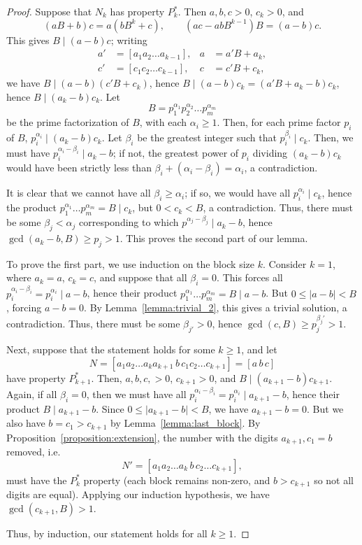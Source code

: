\documentclass[10pt,a4paper]{amsart}
\begin{document}
\begin{proof}
    Suppose that $N_k$ has property $P^*_k$. Then $a, b, c > 0$, $c_k > 0$, and \[
        (aB + b)c = a(bB^k + c), \qquad
        (ac - abB^{k - 1})B = (a - b)c.
    \] This gives $B \mid (a - b)c$; writing \begin{align*}
        a' &= [a_1a_2\dots a_{k - 1}], & a &= a'B + a_k, \\
        c' &= [c_1c_2\dots c_{k - 1}], & c &= c'B + c_k,
    \end{align*} 
    we have $B \mid (a - b)(c'B + c_k)$, hence $B\mid (a - b)c_k = (a'B + a_k - b)c_k$,
    hence $B \mid (a_k - b)c_k$. Let \[
        B = p_1^{\alpha_1}p_2^{\alpha_2}\dots p_m^{\alpha_m}
    \] be the prime factorization of $B$, with each $\alpha_i \geq 1$.
    Then, for each prime factor $p_i$ of $B$, $p_i^{\alpha_i}\mid (a_k - b)c_k$.
    Let $\beta_i$ be the greatest integer such that $p_i^{\beta_i} \mid c_k$.
    Then, we must have $p_i^{\alpha_i - \beta_i} \mid a_k - b$; if not, the greatest
    power of $p_i$ dividing $(a_k - b)c_k$ would have been strictly less than $\beta_i + 
    (\alpha_i - \beta_i) = \alpha_i$, a contradiction.

    It is clear that we cannot have all $\beta_i \geq \alpha_i$; if so, we would have all
    $p_i^{\alpha_i} \mid c_k$, hence the product $p_1^{\alpha_1}\dots p_m^{\alpha_m} = B
    \mid c_k$, but $0 < c_k < B$, a contradiction. Thus, there must be some $\beta_j <
    \alpha_j$ corresponding to which $p^{\alpha_j - \beta_j} \mid a_k - b$, hence 
    $\gcd(a_k - b, B) \geq p_j > 1$. This proves the second part of our lemma.

    To prove the first part, we use induction on the block size $k$.
    Consider $k = 1$, where $a_k = a$, $c_k = c$, and suppose that all $\beta_i = 0$. 
    This forces all $p_i^{\alpha_i - \beta_i} = p_i^{\alpha_i} \mid a - b$, hence 
    their product $p_1^{\alpha_1}\dots p_m^{\alpha_m} = B \mid a - b$. 
    But $0 \leq \vert a - b\vert < B$, forcing $a - b = 0$.
    By Lemma~\ref{lemma:trivial_2}, this gives a trivial solution, a contradiction.
    Thus, there must be some $\beta_{j'} > 0$, hence $\gcd(c, B) \geq p_j^{\beta_j'} > 1$.

    Next, suppose that the statement holds for some $k \geq 1$, and let \[
        N = [a_1a_2\dots a_k a_{k + 1} \,b\, c_1c_2\dots c_{k + 1}] =
        [a\,b\,c]
    \] have property $P^*_{k + 1}$. Then, $a, b, c, > 0$, $c_{k + 1} > 0$,
    and $B \mid (a_{k + 1} - b)c_{k + 1}$. Again, if all $\beta_i = 0$,
    then we must have all $p_i^{\alpha_i - \beta_i} = p_i^{\alpha_i} \mid a_{k + 1} - b$,
    hence their product $B \mid a_{k + 1} - b$.
    Since $0 \leq \vert a_{k + 1} - b \vert < B$, we have $a_{k + 1} - b = 0$. But we also have
    $b = c_1 > c_{k + 1}$ by Lemma~\ref{lemma:last_block}.
    By Proposition~\ref{proposition:extension}, the number with the digits $a_{k + 1}, 
    c_1 = b$ removed, i.e.\ \[
        N' = [a_1a_2\dots a_k\, b\, c_2\dots c_{k + 1}],
    \] must have the $P^*_k$ property (each block remains non-zero, and $b > 
    c_{k + 1}$ so not all digits are equal). Applying our induction hypothesis, we have 
    $\gcd(c_{k + 1}, B) > 1$.

    Thus, by induction, our statement holds for all $k \geq 1$.
\end{proof}
\end{document}
